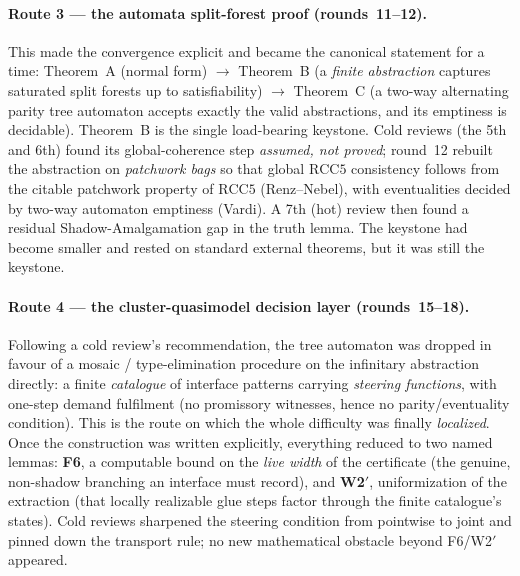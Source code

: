 \documentclass[
]{ceurart}
\theoremstyle{definition}
\begin{document}
\paragraph{Route 3 --- the automata split-forest proof (rounds~11--12).}
This made the convergence explicit and became the canonical statement for
a time: Theorem~A (normal form) $\to$ Theorem~B (a \emph{finite
abstraction} captures saturated split forests up to satisfiability) $\to$
Theorem~C (a two-way alternating parity tree automaton accepts exactly
the valid abstractions, and its emptiness is decidable).  Theorem~B is
the single load-bearing keystone.  Cold reviews (the 5th and 6th) found
its global-coherence step \emph{assumed, not proved}; round~12 rebuilt
the abstraction on \emph{patchwork bags} so that global $\mathrm{RCC5}$
consistency follows from the citable patchwork property of $\mathrm{RCC5}$
(Renz--Nebel), with eventualities decided by two-way automaton emptiness
(Vardi).  A 7th (hot) review then found a residual Shadow-Amalgamation
gap in the truth lemma.  The keystone had become smaller and rested on
standard external theorems, but it was still the keystone.

\paragraph{Route 4 --- the cluster-quasimodel decision layer (rounds~15--18).}
Following a cold review's recommendation, the tree automaton was dropped
in favour of a mosaic / type-elimination procedure on the infinitary
abstraction directly: a finite \emph{catalogue} of interface patterns
carrying \emph{steering functions}, with one-step demand fulfilment (no
promissory witnesses, hence no parity/eventuality condition).  This is
the route on which the whole difficulty was finally \emph{localized}.
Once the construction was written explicitly, everything reduced to two
named lemmas: \textbf{F6}, a computable bound on the \emph{live width} of
the certificate (the genuine, non-shadow branching an interface must
record), and \textbf{W2$'$}, uniformization of the extraction (that
locally realizable glue steps factor through the finite catalogue's
states).  Cold reviews sharpened the steering condition from pointwise to
joint and pinned down the transport rule; no new mathematical obstacle
beyond F6/W2$'$ appeared.
\end{document}

